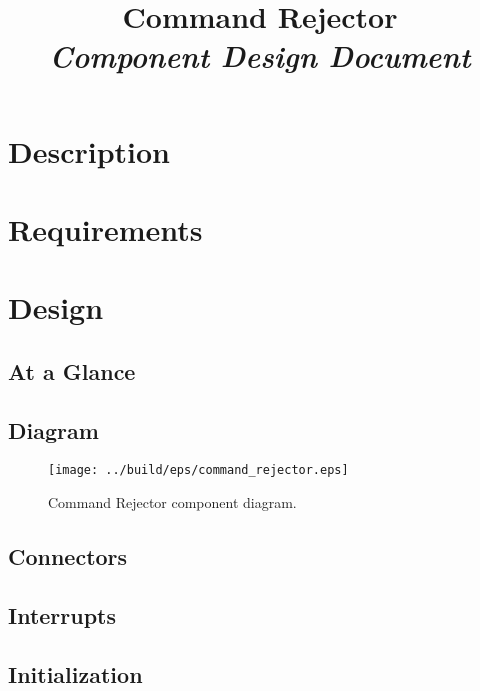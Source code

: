 



\title{\textbf{Command Rejector} \\
\large\textit{Component Design Document}}
\date{}
\maketitle

\section{Description}


\section{Requirements}


\section{Design}

\subsection{At a Glance}


\subsection{Diagram}
\begin{figure}[H]
  \texttt{[image: ../build/eps/command\_rejector.eps]}
  \caption{Command Rejector component diagram.}
\end{figure}

\subsection{Connectors}


\subsection{Interrupts}



\subsection{Initialization}


